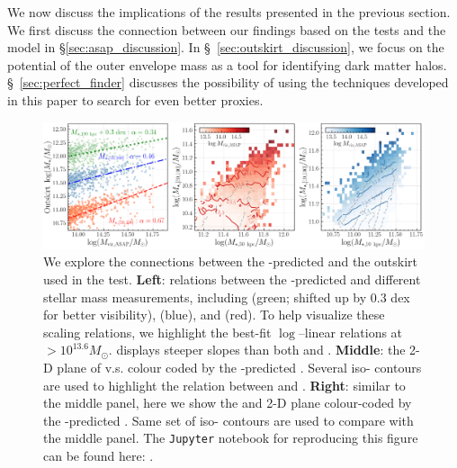\documentclass[fleqn,usenatbib,useAMS]{mnras}
\begin{document}
    We now discuss the implications of the results presented in the previous section.
    We first discuss the connection between our findings based on the \topn{} tests  and the \asap{}
    model in \S \ref{sec:asap_discussion}.
    In \S\ \ref{sec:outskirt_discussion}, we focus on the potential of the outer envelope mass as a
    tool for identifying dark matter halos.
    \S\ \ref{sec:perfect_finder} discusses the possibility of using the techniques developed in this
    paper to search for even better \mvir{} proxies. 
    
\begin{figure}
    \centering
    \includegraphics[width=\textwidth]{figure/fig_11}
    \caption{
        We explore the connections between the \asap{}-predicted \mvir{} and the outskirt 
        \mstar{} used in the \topn{} test. 
        \textbf{Left}: relations between the \asap{}-predicted \mvir{} and different stellar mass
        measurements, including  (green; shifted up by 0.3 dex for better visibility),
         (blue), and  (red).
        To help visualize these scaling relations, we highlight the best-fit $\log$--linear 
        relations at \masap{}$> 10^{13.6} M_{\odot}$.
         displays steeper slopes than both  and .
        \textbf{Middle}: the 2-D plane of  v.s.   colour coded by the
        \asap{}-predicted \mvir{}.
        Several iso-\mvir{} contours are used to highlight the relation between \mvir{} and
        .
        \textbf{Right}: similar to the middle panel, here we show the  and
         2-D plane colour-coded by the \asap{}-predicted \mvir{}.
        Same set of iso-\mvir{} contours are used to compare with the middle panel.
        The \texttt{Jupyter} notebook for reproducing this figure can be found here:
        \href{https://github.com/dr-guangtou/jianbing/blob/master/notebooks/figure/fig12.ipynb}{\faGithub}.
    }
    \label{fig:outskirt_discussion}
\end{figure}
\end{document}
